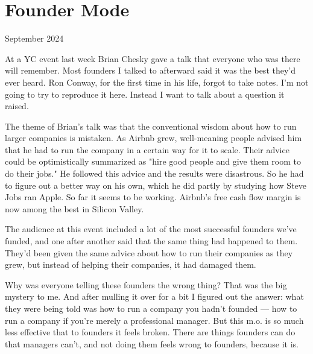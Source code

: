 \chapter{Founder Mode}


          
        
          


          
            
              
                

September 2024

At a YC event last week Brian
                  Chesky gave a talk that everyone who was there will remember.
                  Most founders I talked to afterward said it was the best
                  they'd ever heard. Ron Conway, for the first time in his life,
                  forgot to take notes. I'm not going to try to reproduce it
                  here. Instead I want to talk about a question it raised.

The
                  theme of Brian's talk was that the conventional wisdom about
                  how to run larger companies is mistaken. As Airbnb grew,
                  well-meaning people advised him that he had to run the company
                  in a certain way for it to scale. Their advice could be
                  optimistically summarized as "hire good people and give them
                  room to do their jobs." He followed this advice and the
                  results were disastrous. So he had to figure out a better way
                  on his own, which he did partly by studying how Steve Jobs ran
                  Apple. So far it seems to be working. Airbnb's free cash flow
                  margin is now among the best in Silicon Valley.

The
                  audience at this event included a lot of the most successful
                  founders we've funded, and one after another said that the
                  same thing had happened to them. They'd been given the same
                  advice about how to run their companies as they grew, but
                  instead of helping their companies, it had damaged them.

Why
                  was everyone telling these founders the wrong thing? That was
                  the big mystery to me. And after mulling it over for a bit I
                  figured out the answer: what they were being told was how to
                  run a company you hadn't founded --- how to run a company
                  if you're merely a professional manager. But this m.o. is so
                  much less effective that to founders it feels broken. There
                  are things founders can do that managers can't, and not doing
                  them feels wrong to founders, because it is.

